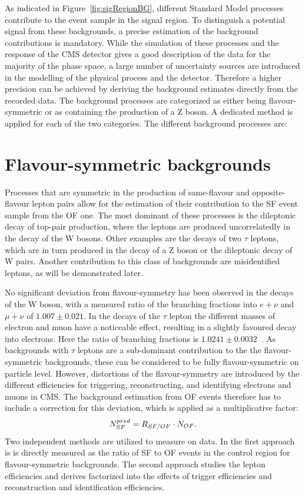 As indicated in Figure~\ref{fig:sigRegionBG}, different Standard Model processes contribute to the event sample in the signal region. To distinguish a potential signal from these backgrounds, a precise estimation of the background contributions is mandatory. While the simulation of these processes and the response of the CMS detector gives a good description of the data for the majority of the phase space, a large number of uncertainty sources are introduced in the modelling of the physical process and the detector. Therefore a higher precision can be achieved by deriving the background estimates directly from the recorded data. The background processes are categorized as either being flavour-symmetric or as containing the production of a Z boson. A dedicated method is applied for each of the two categories. The different background processes are:

\section{Flavour-symmetric backgrounds}
Processes that are symmetric in the production of same-flavour and opposite-flavour lepton pairs allow for the estimation of their contribution to the SF event sample from the OF one. The most dominant of these processes is the dileptonic decay of top-pair production, where the leptons are produced uncorrelatedly in the decay of the W bosons. Other examples are the decays of two $\tau$ leptons, which are in turn produced in the decay of a Z boson or the dileptonic decay of W pairs. Another contribution to this class of backgrounds are misidentified leptons, as will be demonstrated later. 

No significant deviation from flavour-symmetry has been observed in the decays of the W boson, with a measured ratio of the branching fractions into $e+\nu$ and $\mu + \nu$ of $1.007\pm0.021$. In the decays of the $\tau$ lepton the different masses of electron and muon have a noticeable effect, resulting in a slightly favoured decay into electrons. Here the ratio of branching fractions is $1.0241\pm0.0032$~\cite{PDG}. As backgrounds with $\tau$ leptons are a sub-dominant contribution to the the flavour-symmetric backgrounds, these can be considered to be fully flavour-symmetric on particle level. However, distortions of the flavour-symmetry are introduced by the different efficiencies for triggering, reconstructing, and identifying electrons and muons in CMS. The background estimation from OF events therefore has to include a correction for this deviation, which is applied as a multiplicative factor:
\begin{equation}
N_{SF}^{pred} = R_{SF/OF} \cdot N_{OF}.
\end{equation}
Two independent methods are utilized to measure \Rsfof on data. In the first approach is is directly measured as the ratio of SF to OF events in the control region for flavour-symmetric backgrounds. The second approach studies the lepton efficiencies and derives \Rsfof factorized into the effects of trigger efficiencies and reconstruction and identification efficiencies.  

